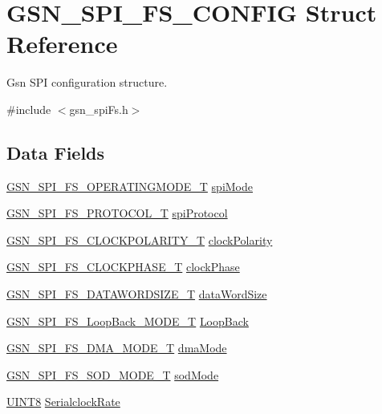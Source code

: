 \hypertarget{a00233}{
\section{GSN\_\-SPI\_\-FS\_\-CONFIG Struct Reference}
\label{a00233}
}


Gsn SPI configuration structure.  




{\ttfamily \#include $<$gsn\_\-spiFs.h$>$}

\subsection*{Data Fields}
\begin{DoxyCompactItemize}
\item 
\hyperlink{a00655_gab173e44df6afa7f56b96f3a05cb857a5}{GSN\_\-SPI\_\-FS\_\-OPERATINGMODE\_\-T} \hyperlink{a00233_a222e972463285c6028dbe0b209416401}{spiMode}
\item 
\hyperlink{a00655_gaa9b496d91ebb6c1e80cbd1b076c55f40}{GSN\_\-SPI\_\-FS\_\-PROTOCOL\_\-T} \hyperlink{a00233_ac72c0246af1fda25902e537d6bf7172c}{spiProtocol}
\item 
\hyperlink{a00655_ga68952a1f7c2baa0ffb682a9689229eaf}{GSN\_\-SPI\_\-FS\_\-CLOCKPOLARITY\_\-T} \hyperlink{a00233_ab371d2331ec382e8dc467667ac9009d6}{clockPolarity}
\item 
\hyperlink{a00655_gaf3bb2adb7491e3d235c486d48f1b506d}{GSN\_\-SPI\_\-FS\_\-CLOCKPHASE\_\-T} \hyperlink{a00233_ab8f87412e17e4d7b63efa4741fa0a00f}{clockPhase}
\item 
\hyperlink{a00655_gaad2f137ab7bba85003348a4b895e435d}{GSN\_\-SPI\_\-FS\_\-DATAWORDSIZE\_\-T} \hyperlink{a00233_abaf4d32b527a323149448f3ffbf266fe}{dataWordSize}
\item 
\hyperlink{a00655_ga721139ec14f269f577231293b4b96dad}{GSN\_\-SPI\_\-FS\_\-LoopBack\_\-MODE\_\-T} \hyperlink{a00233_a25824ede1b0ab5fe6fbf7564e6ca053c}{LoopBack}
\item 
\hyperlink{a00655_ga1348552a2785bfc5647d4b4aa234c64c}{GSN\_\-SPI\_\-FS\_\-DMA\_\-MODE\_\-T} \hyperlink{a00233_ac51b04e9415de12b2e97604acf5c3adc}{dmaMode}
\item 
\hyperlink{a00655_gaa0f62d38ee68880a4e3bb673a05d293d}{GSN\_\-SPI\_\-FS\_\-SOD\_\-MODE\_\-T} \hyperlink{a00233_a25db6532bb07468abba98f1872303945}{sodMode}
\item 
\hyperlink{a00660_gab27e9918b538ce9d8ca692479b375b6a}{UINT8} \hyperlink{a00233_aceb3f680c7de4959ad53b0e20baf8a5c}{SerialclockRate}

\end{DoxyCompactItemize}
